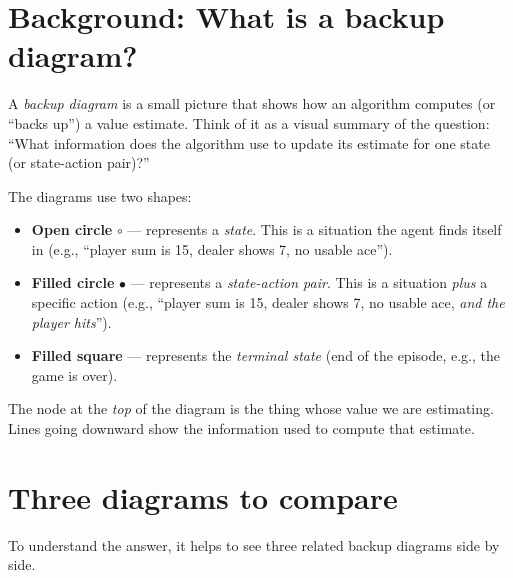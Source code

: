 \documentclass[11pt]{article}
\begin{document}
\section*{Background: What is a backup diagram?}

A \textit{backup diagram} is a small picture that shows how an algorithm computes (or ``backs up'') a value estimate. Think of it as a visual summary of the question: ``What information does the algorithm use to update its estimate for one state (or state-action pair)?''

The diagrams use two shapes:
\begin{itemize}[nosep]
    \item \textbf{Open circle} $\circ$ --- represents a \textit{state}. This is a situation the agent finds itself in (e.g., ``player sum is 15, dealer shows 7, no usable ace'').
    \item \textbf{Filled circle} $\bullet$ --- represents a \textit{state-action pair}. This is a situation \textit{plus} a specific action (e.g., ``player sum is 15, dealer shows 7, no usable ace, \textit{and the player hits}'').
    \item \textbf{Filled square} --- represents the \textit{terminal state} (end of the episode, e.g., the game is over).
\end{itemize}

The node at the \textit{top} of the diagram is the thing whose value we are estimating. Lines going downward show the information used to compute that estimate.

\section*{Three diagrams to compare}

To understand the answer, it helps to see three related backup diagrams side by side.
\end{document}
